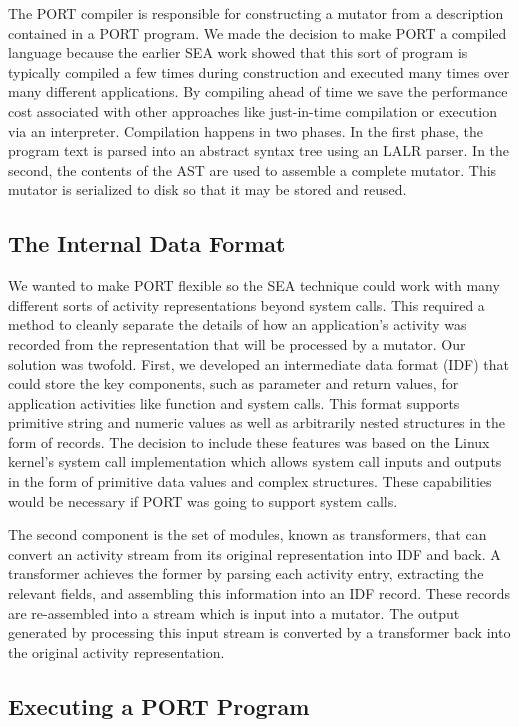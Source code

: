 The PORT compiler is responsible for constructing a mutator
from a description contained in  a PORT program.
We made the decision to make PORT a compiled language because
the earlier SEA work showed that this sort of program is typically
compiled a few times during construction
and executed many times over many different applications.
By compiling ahead of time we save the performance cost associated with other
approaches like just-in-time compilation or execution via an interpreter.
Compilation happens in two phases.  In the first phase, the program text is
parsed into an abstract syntax tree using an LALR parser.
In the second, the
contents of the AST are used to assemble a complete mutator.
This mutator is serialized to
disk so that it may be stored and reused.


\subsection{The Internal Data Format}

We wanted to make PORT flexible
so the SEA technique
could
work with many different sorts of
activity representations beyond system calls.
This required a method to cleanly separate the details of how
an application's activity was recorded from the representation that will be
processed by a mutator.
Our solution was twofold.  First, we developed an intermediate data format
(IDF) that
could store the key components, such as parameter and return values,
for application activities like function
and system calls.  This format supports primitive string and numeric
values as well as arbitrarily nested structures in the form of records.
The decision to include these features
was based on the Linux kernel's system call implementation
which allows system call inputs and outputs in the form of primitive data
values and complex structures.
These capabilities would be necessary
if PORT was going to support system calls.

The second component is the set of modules, known as transformers, that can
convert an activity stream from its original representation into IDF and
back.  A transformer achieves the former by parsing each activity entry,
extracting the relevant fields, and assembling this information into an IDF
record.  These records are re-assembled into a stream which is input into a
mutator.
The output generated by processing this input stream
is converted by a transformer
back into the original activity representation.

\subsection{Executing a PORT Program}

